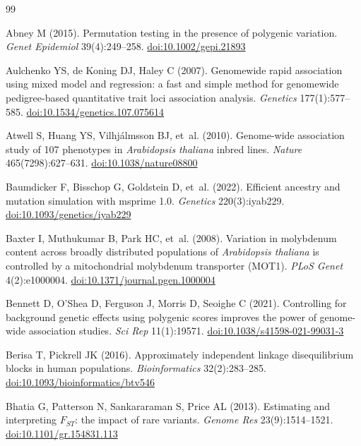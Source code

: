 \documentclass[11pt]{article}
\begin{document}
\begin{thebibliography}{99}
\raggedright

Abney M (2015). Permutation testing in the presence of polygenic
variation. \emph{Genet Epidemiol} 39(4):249--258.
\href{https://doi.org/10.1002/gepi.21893}{doi:10.1002/gepi.21893}

Aulchenko YS, de Koning DJ, Haley C (2007). Genomewide rapid association
using mixed model and regression: a fast and simple method for genomewide
pedigree-based quantitative trait loci association analysis.
\emph{Genetics} 177(1):577--585.
\href{https://doi.org/10.1534/genetics.107.075614}{doi:10.1534/genetics.107.075614}

Atwell S, Huang YS, Vilhj\'almsson BJ, et~al. (2010). Genome-wide
association study of 107 phenotypes in \emph{Arabidopsis thaliana} inbred
lines. \emph{Nature} 465(7298):627--631.
\href{https://doi.org/10.1038/nature08800}{doi:10.1038/nature08800}

Baumdicker F, Bisschop G, Goldstein D, et~al. (2022). Efficient ancestry
and mutation simulation with msprime 1.0. \emph{Genetics} 220(3):iyab229.
\href{https://doi.org/10.1093/genetics/iyab229}{doi:10.1093/genetics/iyab229}

Baxter I, Muthukumar B, Park HC, et~al. (2008). Variation in molybdenum
content across broadly distributed populations of \emph{Arabidopsis
thaliana} is controlled by a mitochondrial molybdenum transporter (MOT1).
\emph{PLoS Genet} 4(2):e1000004.
\href{https://doi.org/10.1371/journal.pgen.1000004}{doi:10.1371/journal.pgen.1000004}

Bennett D, O'Shea D, Ferguson J, Morris D, Seoighe C (2021). Controlling
for background genetic effects using polygenic scores improves the power of
genome-wide association studies. \emph{Sci Rep} 11(1):19571.
\href{https://doi.org/10.1038/s41598-021-99031-3}{doi:10.1038/s41598-021-99031-3}

Berisa T, Pickrell JK (2016). Approximately independent linkage
disequilibrium blocks in human populations. \emph{Bioinformatics}
32(2):283--285.
\href{https://doi.org/10.1093/bioinformatics/btv546}{doi:10.1093/bioinformatics/btv546}

Bhatia G, Patterson N, Sankararaman S, Price AL (2013). Estimating and
interpreting $F_{ST}$: the impact of rare variants. \emph{Genome Res}
23(9):1514--1521.
\href{https://doi.org/10.1101/gr.154831.113}{doi:10.1101/gr.154831.113}


\end{thebibliography}
\end{document}
